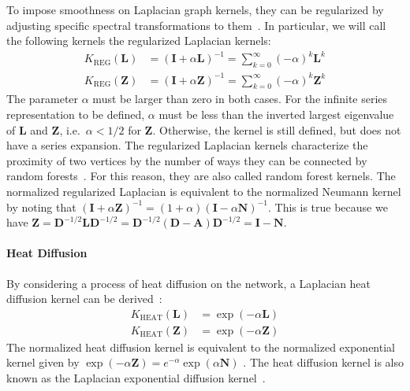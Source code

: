 \documentclass[11pt,a4paper]{book}
\begin{document}
To impose smoothness on Laplacian graph kernels, they can be regularized
by adjusting specific spectral transformations to them~\cite{b155}.  In
particular, we will call the following kernels the regularized Laplacian
kernels: 
\begin{align}
  K_{\mathrm{REG}}(\mathbf L)  &= (\mathbf I+\alpha \mathbf L)^{-1} 
  = \sum_{k=0}^\infty (-\alpha)^k\mathbf L^k 
  \label{eq:regularized-laplacian-kernel} \\
  K_{\mathrm{REG}}(\mathbf Z) &= (\mathbf I+\alpha \mathbf Z)^{-1} 
  = \sum_{k=0}^\infty (-\alpha)^k\mathbf Z^k
  \label{eq:normalized-regularized-laplacian-kernel} 
\end{align}
The parameter $\alpha$ must be larger than zero in both cases. 
For the infinite series representation to be defined, $\alpha$ must be
less than the inverted largest eigenvalue of $\mathbf L$ and $\mathbf
Z$, i.e.\ $\alpha < 1/2$ for $\mathbf Z$.  Otherwise, the kernel is
still defined, but does not have a series expansion. 
The regularized Laplacian kernels characterize the proximity of two
vertices by the number of ways they can be connected by random
forests~\cite{b190}.  For this reason, they are also called random forest
kernels. 
The normalized regularized Laplacian is equivalent to the normalized 
Neumann kernel by noting that $(\mathbf I+\alpha \mathbf Z)^{-1}
=(1+\alpha)(\mathbf I-\alpha\mathbf N)^{-1}$.  This is true because we
have $\mathbf Z=\mathbf D^{-1/2} \mathbf L \mathbf D^{-1/2} = \mathbf
D^{-1/2} (\mathbf D - \mathbf A)\mathbf D^{-1/2}=\mathbf I-\mathbf N$. 

\paragraph{Heat Diffusion}
By considering a process of heat diffusion on the network, a Laplacian heat
diffusion kernel can be derived~\cite{b137}: 
\begin{align}
  K_{\mathrm{HEAT}}(\mathbf L)  &= \exp(-\alpha \mathbf
  L) \label{eq:heat-diffusion} \\ 
  K_{\mathrm{HEAT}}(\mathbf Z) &= \exp(-\alpha \mathbf Z) 
  \label{eq:normalized-heat-diffusion}
\end{align}
The normalized heat diffusion kernel is equivalent to the normalized exponential
kernel given by $\exp(-\alpha \mathbf Z) = e^{-\alpha} \exp(\alpha \mathbf
N)$ \cite{b155}.
The heat diffusion kernel is also known as the Laplacian exponential
diffusion kernel~\cite{b152}. 
\end{document}
